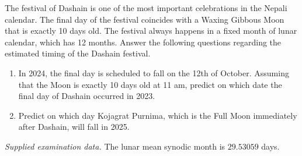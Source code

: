 The festival of Dashain is one of the most important celebrations in the Nepali calendar. The final day of the festival coincides with a Waxing Gibbous Moon that is exactly 10 days old. The festival always happens in a fixed month of lunar calendar, which has 12 months. Answer the following questions regarding the estimated timing of the Dashain festival.
\begin{enumerate}
\item In 2024, the final day is scheduled to fall on the 12th of October. Assuming that the Moon is exactly 10 days old at 11 am, predict on which date the final day of Dashain occurred in 2023.
\item Predict on which day Kojagrat Purnima, which is the Full Moon immediately after Dashain, will fall in 2025.
\end{enumerate}
\textit{Supplied examination data.} The lunar mean synodic month is $29.53059$ days.
